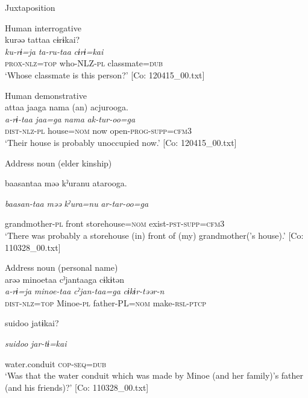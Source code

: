 \begin{table}
\ea\label{ex:6-112}
  Juxtaposition

 \ea Human interrogative\\
{\TM}
\glll  kurəə  tattaa  cɨrɨkai?\\
\textit{ku-rɨ=ja}  \textit{ta-ru-taa}  \textit{cɨrɨ=kai}\\
\textsc{prox}-\textsc{nlz}=\textsc{top}  who-NLZ-\textsc{pl}  classmate=\textsc{dub}\\
\glt ‘Whose classmate is this person?’ [Co: 120415\_00.txt]
\z

\ex Human demonstrative\\
{\TM}
\glll  attaa  jaaga  nama  (an)  acjurooga.\\
\textit{a-rɨ-taa}  \textit{jaa=ga}  \textit{nama}    \textit{ak-tur-oo=ga}\\
\textsc{dist}-\textsc{nlz}-\textsc{pl}  house=\textsc{nom}  now    open-\textsc{prog}-\textsc{supp}=\textsc{cfm}3\\
\glt ‘Their house is probably unoccupied now.’ [Co: 120415\_00.txt]
\z

\ex Address noun (elder kinship)\\
\gll

{\US}
baasantaa  məə  kˀuranu  atarooga.

      \textit{baasan-taa}  \textit{məə}  \textit{kˀura=nu}  \textit{ar-tar-oo=ga}

      grandmother-\textsc{pl}  front  storehouse=\textsc{nom}  exist-\textsc{pst}-\textsc{supp}=\textsc{cfm}3\\
\glt ‘There was probably a storehouse (in) front of (my) grandmother(’s house).’ [Co: 110328\_00.txt]
\z

\ex Address noun (personal name)\\
{\TM}
\glll  arəə  minoetaa  cˀjantaaga  cɨkɨtən\\
\textit{a-rɨ=ja}  \textit{minoe-taa}  \textit{cˀjan-taa=ga}  \textit{cɨkɨr-təər-n}\\
\textsc{dist}-\textsc{nlz}=\textsc{top}  Minoe-\textsc{pl}  father-PL=\textsc{nom}  make-\textsc{rsl}-\textsc{ptcp}

      {\textbar}suidoo{\textbar}  jatɨkai?

      \textit{suidoo}  \textit{jar-tɨ=kai}

      water.conduit  \textsc{cop}-\textsc{seq}=\textsc{dub}\\
\glt ‘Was that the water conduit which was made by Minoe (and her family)’s father (and his friends)?’ [Co: 110328\_00.txt]
\z


\end{table}
